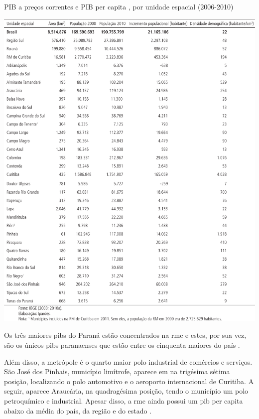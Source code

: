 	\begin{table}
		\centering
		\caption{PIB a preços correntes e PIB per capita , por unidade espacial (2006-2010)}
		\includegraphics[width=1.0\linewidth]{img/costa2015a_10}
		\label{tab:costa2015a_10}
	\end{table}

	Os três maiores \gls{pib}s do Paraná estão concentrados na \glsdesc{rmc} e estes, por sua vez, são os únicos \gls{pib}s paranaenses que estão entre os cinquenta maiores do país \cite[p. 11]{costa2015a}.

	Além disso,  a metrópole é o quarto maior polo industrial de comércios e serviços. São José dos Pinhais, município limítrofe, aparece em na trigésima sétima posição, localizando o polo automotivo e o aeroporto internacional de Curitiba. A seguir, aparece Araucária, na quadragésima posição, tendo o município um polo petroquímico e industrial. Apesar disso, a \gls{rmc} ainda possui um \gls{pib} per capita abaixo da média do país, da região e do estado \cite[p. 11]{costa2015a}.
	
